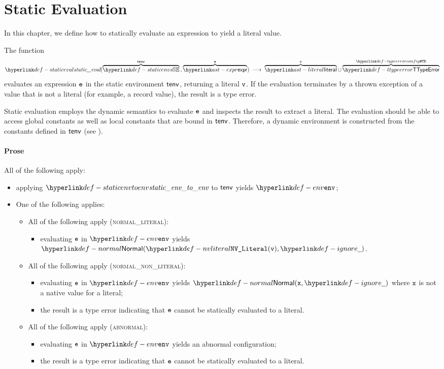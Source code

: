 \chapter{Static Evaluation\label{chap:staticevaluation}}

In this chapter, we define how to statically evaluate an expression
to yield a literal value.

\hypertarget{def-staticeval}{}
The function
\[
  \staticeval(\overname{\staticenvs}{\tenv} \aslsep \overname{\expr}{\ve}) \;\aslto\;
  \overname{\literal}{\vv} \cup
  \overname{\TTypeError}{\TypeErrorConfig}
\]
evaluates an expression $\texttt{e}$
in the static environment $\textsf{tenv}$, returning a literal $\texttt{v}$.
If the evaluation terminates by a thrown exception of a value that is not a literal
(for example, a record value), the result is a type error.

Static evaluation employs the dynamic semantics to evaluate $\texttt{e}$ and inspects the result to extract
a literal. The evaluation should be able to access global constants as well as local constants that
are bound in $\textsf{tenv}$. Therefore, a dynamic environment is constructed from the constants defined in $\textsf{tenv}$
(see ).

\subsubsection{Prose}
All of the following apply:
\begin{itemize}
  \item applying $\staticenvtoenv$ to $\textsf{tenv}$ yields $\env$;
  \item One of the following applies:
  \begin{itemize}
    \item All of the following apply (\textsc{normal\_literal}):
    \begin{itemize}
      \item evaluating $\texttt{e}$ in $\env$ yields $\Normal(\nvliteral{\vv}, \Ignore)$.
    \end{itemize}

    \item All of the following apply (\textsc{normal\_non\_literal}):
    \begin{itemize}
      \item evaluating $\texttt{e}$ in $\env$ yields $\Normal(\vx, \Ignore)$
            where $\texttt{x}$ is not a native value for a literal;
      \item the result is a type error indicating that $\texttt{e}$ cannot be statically evaluated to a literal.
    \end{itemize}

    \item All of the following apply (\textsc{abnormal}):
    \begin{itemize}
      \item evaluating $\texttt{e}$ in $\env$ yields an abnormal configuration;
      \item the result is a type error indicating that $\texttt{e}$ cannot be statically evaluated to a literal.
    \end{itemize}
  \end{itemize}
\end{itemize}


